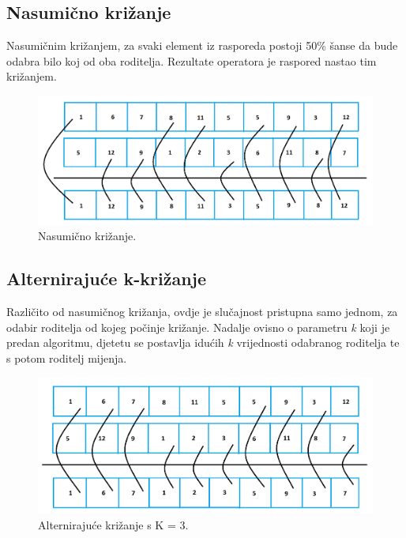 \documentclass[times, utf8, zavrsni]{fer}
\begin{document}
\subsection{Nasumično križanje}

Nasumičnim križanjem, za svaki element iz rasporeda postoji 50\% šanse da bude odabra bilo koj od oba roditelja. Rezultate operatora je raspored nastao tim križanjem.

\begin{figure}[htb]
\centering
\includegraphics[width=15cm]{images/rand_cross.png}
\caption{Nasumično križanje.}
\label{fig:rand_cross}
\end{figure}

\subsection{Alternirajuće k-križanje}

Različito od nasumičnog križanja, ovdje je slučajnost pristupna samo jednom, za odabir roditelja od kojeg počinje križanje. Nadalje ovisno o parametru \emph{k} koji je predan algoritmu, djetetu se postavlja idućih \emph{k} vrijednosti odabranog roditelja te s potom roditelj mijenja.

\begin{figure}[htb]
\centering
\includegraphics[width=15cm]{images/cross_alt.png}
\caption{Alternirajuće križanje s K = 3.}
\label{fig:cross_alt}
\end{figure}
\end{document}

